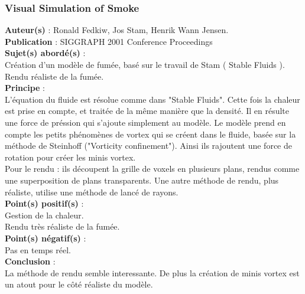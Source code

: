 \documentclass[a4paper,10pt]{article}
\begin{document}
\subsubsection{Visual Simulation of Smoke}
\textbf{Auteur(s)} : Ronald Fedkiw, Jos Stam, Henrik Wann Jensen.\\
\textbf{Publication} : SIGGRAPH 2001 Conference Proceedings \\
\textbf{Sujet(s) abordé(s)} : \\
	Création d'un modèle de fumée, basé sur le travail de Stam ( Stable Fluids ).\\
	Rendu réaliste de la fumée.\\
\textbf{Principe} :\\	
	L'équation du fluide est résolue comme dans "Stable Fluids". Cette fois la chaleur est prise en compte, et traitée de la même manière que la densité. Il en résulte une force de préssion qui s'ajoute simplement au modèle. Le modèle prend en compte les petits phénomènes de vortex qui se créent dans le fluide, basée sur la méthode de Steinhoff ("Vorticity confinement"). Ainsi ils rajoutent une force de rotation pour créer les minis vortex.\\
Pour le rendu : ils découpent la grille de voxels en plusieurs plans, rendus comme une superposition de plans transparents.
Une autre méthode de rendu, plus réaliste, utilise une méthode de lancé de rayons.\\
\textbf{Point(s) positif(s)} :\\
	Gestion de la chaleur.\\
	Rendu très réaliste de la fumée.\\
\textbf{Point(s) négatif(s)} :\\
	Pas en temps réel.\\
\textbf{Conclusion} :\\
	La méthode de rendu semble interessante. De plus la création de minis vortex est un atout pour le côté réaliste du modèle.
\end{document}
